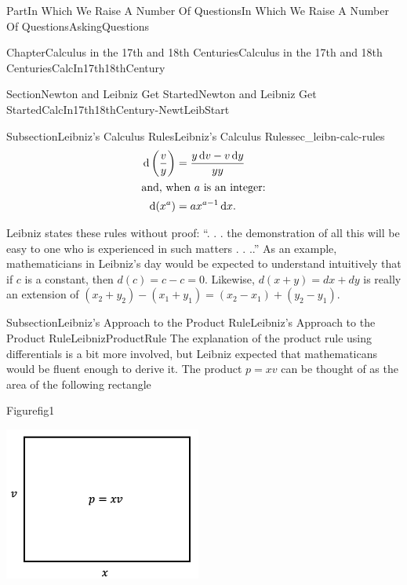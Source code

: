 \documentclass[oneside,10pt,]{book}
\numberwithin{equation}{part}
\newcommand{\dx}[1]{\,{\rm d}#1}
\newcommand{\amp}{&}
\begin{document}
\begin{partptx}{Part}{In Which We Raise A Number Of Questions}{}{In Which We Raise A Number Of Questions}{}{}{AskingQuestions}
\begin{chapterptx}{Chapter}{Calculus in the 17th and 18th Centuries}{}{Calculus in the 17th and 18th Centuries}{}{}{CalcIn17th18thCentury}
\begin{sectionptx}{Section}{Newton and Leibniz Get Started}{}{Newton and Leibniz Get Started}{}{}{CalcIn17th18thCentury-NewtLeibStart}
\begin{subsectionptx}{Subsection}{Leibniz's Calculus Rules}{}{Leibniz's Calculus Rules}{}{}{sec_leibn-calc-rules}
\begin{align*}
\dx{\left(\frac{v}{y}\right)}\amp =\frac{y\dx{ v}-v\dx{ y}}{yy}\\
\intertext{and, when \(a\) is an integer:}
\dx{(x^a)}\amp =ax^{a-1}\dx{ x}\text{.}
\end{align*}
%
\par
Leibniz states these rules without proof: ``. . . the demonstration of all this will be easy to one who is experienced in such matters . . ..'' As an example, mathematicians in Leibniz's day would be expected to understand intuitively that if \(c\) is a constant, then \(d(c)=c-c=0\).  Likewise, \(d(x+y)=dx+dy\) is really an extension of \((x_2+y_2)-(x_1+y_1)=(x_2-x_1)+(y_2-y_1)\).%
\end{subsectionptx}
%
%
\typeout{************************************************}
\typeout{************************************************}
%
\begin{subsectionptx}{Subsection}{Leibniz's Approach to the Product Rule}{}{Leibniz's Approach to the Product Rule}{}{}{LeibnizProductRule}
 The explanation of the product rule using differentials is a bit more involved, but Leibniz expected that mathematicans would be fluent enough to derive it.  The product \(p=xv\) can be thought of as the area of the following rectangle%
\begin{figureptx}{Figure}{}{fig1}{}%
\begin{image}{0.25}{0.5}{0.25}{}%
\includegraphics[width=\linewidth]{external/images/fig1.png}
\end{image}%
\tcblower

\end{figureptx}
\end{subsectionptx}
\end{sectionptx}
\end{chapterptx}
\end{partptx}
\end{document}
